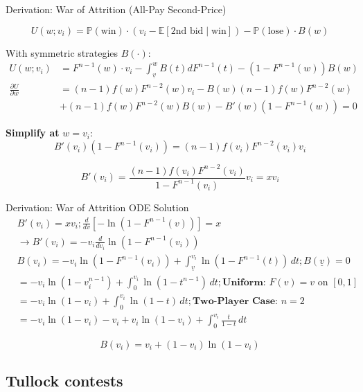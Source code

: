 \documentclass[xcolor={x11names}]{beamer}
\begin{document}
\begin{frame}{Derivation: War of Attrition (All-Pay Second-Price)}

$$U(w; v_i) = \mathbb{P}(\text{win}) \cdot (v_i - \mathbb{E}[\text{2nd bid} \mid \text{win}]) - \mathbb{P}(\text{lose}) \cdot B(w)$$

With symmetric strategies $B(\cdot)$:
\begin{align*}
U(w; v_i) &= F^{n-1}(w) \cdot v_i - \int_{\underline{v}}^w B(t) dF^{n-1}(t) - (1-F^{n-1}(w))B(w) \\
\frac{\partial U}{\partial w} & = (n-1)f(w)F^{n-2}(w)v_i - B(w)(n-1)f(w)F^{n-2}(w) \\
\quad\quad\quad\quad &+ (n-1)f(w)F^{n-2}(w)B(w) - B'(w)(1-F^{n-1}(w)) = 0
\end{align*}

\textbf{Simplify at} $w = v_i$:
$$B'(v_i)(1-F^{n-1}(v_i)) = (n-1)f(v_i)F^{n-2}(v_i)v_i$$

$$B'(v_i) = \frac{(n-1)f(v_i)F^{n-2}(v_i)}{1-F^{n-1}(v_i)} v_i = x v_i$$
\end{frame}

\begin{frame}{Derivation: War of Attrition ODE Solution}
\begin{align*}
& B'(v_i) = x v_i;
\frac{d}{dv}[-\ln(1-F^{n-1}(v))] =  x \\
& \rightarrow B'(v_i) = -v_i \frac{d}{dv_i}\ln(1-F^{n-1}(v_i)) \\
& B(v_i) = -v_i\ln(1-F^{n-1}(v_i)) + \int_{\underline{v}}^{v_i} \ln(1-F^{n-1}(t)) \, dt;
B(\underline{v}) = 0 \\
& = -v_i\ln(1-v_i^{n-1}) + \int_0^{v_i} \ln(1-t^{n-1}) \, dt;
\textbf{Uniform: } F(v) = v \text{ on } [0,1] \\
& = -v_i\ln(1-v_i) + \int_0^{v_i} \ln(1-t) \, dt;
\textbf{Two-Player Case: } n=2 \\
& = -v_i\ln(1-v_i) - v_i + v_i\ln(1-v_i) + \int_0^{v_i} \frac{t}{1-t} \, dt 
\end{align*}

$$\boxed{B(v_i) = v_i + (1-v_i)\ln(1-v_i)}$$
\end{frame}

\subsection{Tullock contests}
\end{document}
